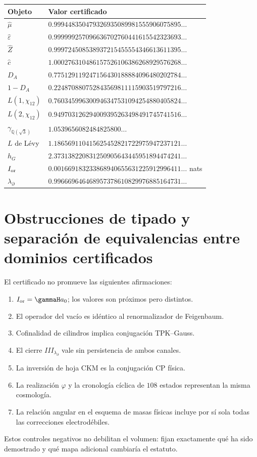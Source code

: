 \begin{longtable}{@{}>{\raggedright\arraybackslash}p{}>{\raggedright\arraybackslash}p{}@{}}
\toprule
Objeto & Valor certificado\\
\midrule
\endhead
\(\widehat\mu\) & \(0.999448350479326935089981555906075895\ldots\)\\
\(\widehat\varepsilon\) & \(0.999999257096636702760441615542323693\ldots\)\\
\(\widehat Z\) & \(0.999724508538937215455554346613611395\ldots\)\\
\(\widehat c\) & \(1.000276310486157526106386268929576268\ldots\)\\
\(D_A\) & \(0.775129119247156430188884096480202784\ldots\)\\
\(1-D_A\) & \(0.224870880752843569811115903519797216\ldots\)\\
\(L(1,\chi_{12})\) & \(0.760345996300946347531094254880405824\ldots\)\\
\(L(2,\chi_{12})\) & \(0.949703126294009395263498491745741516\ldots\)\\
\(\gamma_{\mathbb Q(\sqrt3)}\) & \(1.0539656082484825800\ldots\)\\
\(L\) de L\'evy & \(1.186569110415625452821722975947237121\ldots\)\\
\(h_G\) & \(2.373138220831250905643445951894474241\ldots\)\\
\(I_{\rm or}\) & \(0.001669183233868940655631225912996411\ldots\) nats\\
\(\lambda_\partial\) & \(0.996669646468957378610829976885164731\ldots\)\\
\bottomrule
\end{longtable}

\section{Obstrucciones de tipado y separación de equivalencias entre dominios certificados}

El certificado no promueve las siguientes afirmaciones:

\begin{enumerate}
\item \(I_{\rm or}=\gammaH a_0\); los valores son pr\'oximos pero distintos.
\item El operador del vac\'io es id\'entico al renormalizador de Feigenbaum.
\item Cofinalidad de cilindros implica conjugaci\'on TPK--Gauss.
\item El cierre \(III_{\lambda_\partial}\) vale sin persistencia de ambos canales.
\item La inversi\'on de hoja CKM es la conjugaci\'on CP f\'isica.
\item La realizaci\'on \(\varphi\) y la cronolog\'ia c\'iclica de \(108\) estados
representan la misma cosmolog\'ia.
\item La relaci\'on angular en el esquema de masas f\'isicas incluye por s\'i sola todas las correcciones electrod\'ebiles.
\end{enumerate}

Estos controles negativos no debilitan el volumen: fijan exactamente qu\'e ha sido demostrado y qu\'e mapa adicional cambiar\'ia el estatuto.
